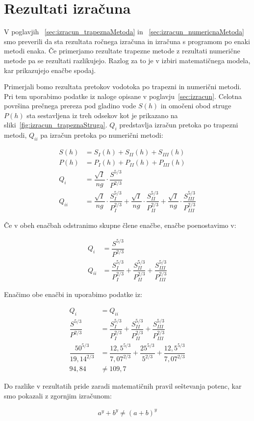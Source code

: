 \section{Rezultati izračuna}
V poglavjih ~\ref{sec:izracun_trapeznaMetoda} in ~\ref{sec:izracun_numericnaMetoda} smo preverili da sta rezultata ročnega izračuna in izračuna s programom po enaki metodi enaka. Če primerjamo rezultate trapezne metode z rezultati numerične metode pa se rezultati razlikujejo. Razlog za to je v izbiri matematičnega modela, kar prikazujejo enačbe spodaj.

Primerjali bomo rezultata pretokov vodotoka po trapezni in numerični metodi. Pri tem uporabimo podatke iz naloge opisane v poglavju~\ref{sec:izracun}. Celotna površina prečnega prereza pod gladino vode $S(h)$ in omočeni obod struge $P(h)$ sta sestavljena iz treh odsekov kot je prikazano na sliki~\ref{fig:izracun_trapeznaStruga}. $Q_i$ predstavlja izračun pretoka po trapezni metodi, $Q_{ii}$ pa izračun pretoka po numerični metodi:
\begin{ceqn}
\begin{align}
S(h)&= S_I(h) + S_{II}(h) + S_{III}(h)\\
P(h)&= P_I(h) + P_{II}(h) + P_{III}(h)\\
Q_i &= \dfrac{\sqrt{I}}{ng} \cdot \dfrac{S^{5/3}}{P^{2/3}} \\
Q_{ii} &= \dfrac{\sqrt{I}}{ng} \cdot \dfrac{S_I^{5/3}}{P_I^{2/3}} + \dfrac{\sqrt{I}}{ng} \cdot \dfrac{S_{II}^{5/3}}{P_{II}^{2/3}} + \dfrac{\sqrt{I}}{ng} \cdot \dfrac{S_{III}^{5/3}}{P_{III}^{2/3}}
\end{align}
\end{ceqn}

Če v obeh enačbah odstranimo skupne člene enačbe, enačbe poenostavimo v:

\begin{ceqn}
\begin{align}
Q_i &=\dfrac{S^{5/3}}{P^{2/3}}\\
Q_{ii} &= \dfrac{S_I^{5/3}}{P_I^{2/3}} + \dfrac{S_{II}^{5/3}}{P_{II}^{2/3}} + \dfrac{S_{III}^{5/3}}{P_{III}^{2/3}}
\end{align}
\end{ceqn}


Enačimo obe enačbi in uporabimo podatke iz:
\begin{ceqn}
\begin{align}
Q_i &= Q_{ii}\\
\dfrac{S^{5/3}}{P^{2/3}} &= \dfrac{S_I^{5/3}}{P_I^{2/3}} + \dfrac{S_{II}^{5/3}}{P_{II}^{2/3}} + \dfrac{S_{III}^{5/3}}{P_{III}^{2/3}}\\
\dfrac{50^{5/3}}{19,14^{2/3}} &= \dfrac{12,5^{5/3}}{7,07^{2/3}} + \dfrac{25^{5/3}}{5^{2/3}} + \dfrac{12,5^{5/3}}{7,07^{2/3}}\\
94,84 &\neq 109,7
\end{align}
\end{ceqn}


Do razlike v rezultatih pride zaradi matematičnih pravil seštevanja potenc, kar smo pokazali z zgornjim izračunom:
\begin{ceqn}
\begin{align}
a^y + b^y \neq (a+b)^y
\end{align}
\end{ceqn}



